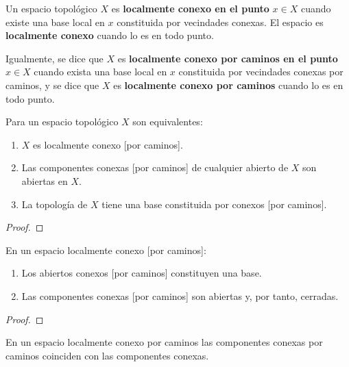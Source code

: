 \begin{definición}
    Un espacio topológico $X$ es \textbf{localmente conexo en el punto} $x \in X$ cuando existe una base local en $x$ constituida por vecindades conexas. El espacio es \textbf{localmente conexo} cuando lo es en todo punto.

    Igualmente, se dice que $X$ es \textbf{localmente conexo por caminos en el punto} $x \in X$ cuando exista una base local en $x$ constituida por vecindades conexas por caminos, y se dice que $X$ es \textbf{localmente conexo por caminos} cuando lo es en todo punto.
\end{definición}
\begin{teorema}
    Para un espacio topológico $X$ son equivalentes:
    \begin{enumerate}[label=\alph*)]
        \item $X$ es localmente conexo [por caminos].
        \item Las componentes conexas [por caminos] de cualquier abierto de $X$ son abiertas en $X$.
        \item La topología de $X$ tiene una base constituida por conexos [por caminos].
    \end{enumerate}
\end{teorema}
\begin{proof}
\end{proof}
\begin{corolario}
    En un espacio localmente conexo [por caminos]:
    \begin{enumerate}[label=\alph*)]
        \item Los abiertos conexos [por caminos] constituyen una base.
        \item Las componentes conexas [por caminos] son abiertas y, por tanto, cerradas.
    \end{enumerate}
\end{corolario}
\begin{proof}
\end{proof}
\begin{proposición}
    En un espacio localmente conexo por caminos las componentes conexas por caminos coinciden con las componentes conexas.
\end{proposición}
